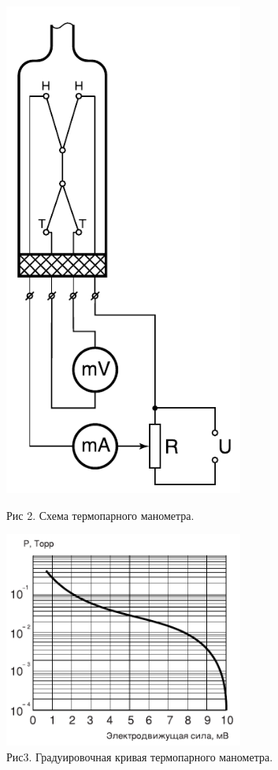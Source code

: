 \documentclass[a4paper]{article}
\begin{document}
    \begin{figure}[h]
    \centering
    \begin{minipage}{0.3\textwidth}
        \centering
        \includegraphics[width=0.7\textwidth]{termoparni_monometr}
        \caption{Рис 2. Схема термопарного манометра.}
        \label{ris:termoparni_monometr}
    \end{minipage}\hfill
    \begin{minipage}{0.7\textwidth}
        \centering
        \includegraphics[width=0.7\textwidth]{termopara_graduirovka}
        \caption{Рис3. Градуировочная кривая термопарного манометра.}
        \label{ris:termopara_graduirovka}
    \end{minipage}
    \end{figure}
\end{document}
